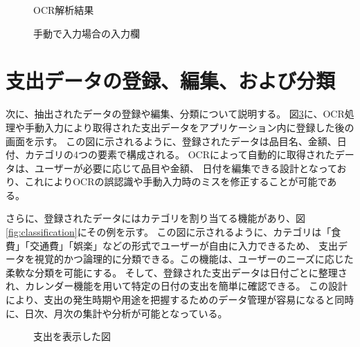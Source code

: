 \documentclass[main]{subfiles}
\begin{document}
\begin{figure}[tb]
    \begin{center}
        \caption{OCR解析結果}
        \label{fig:OCRresult}
    \end{center}
\end{figure}

\begin{figure}[tb]
    \begin{center}
        \caption{手動で入力場合の入力欄}
        \label{fig:input}
    \end{center}
\end{figure}

\section{支出データの登録、編集、および分類}

次に、抽出されたデータの登録や編集、分類について説明する。
図\ref{fig:Registration}に、OCR処理や手動入力により取得された支出データをアプリケーション内に登録した後の画面を示す。
この図に示されるように、登録されたデータは品目名、金額、日付、カテゴリの4つの要素で構成される。
OCRによって自動的に取得されたデータは、ユーザーが必要に応じて品目や金額、
日付を編集できる設計となっており、これによりOCRの誤認識や手動入力時のミスを修正することが可能である。

さらに、登録されたデータにはカテゴリを割り当てる機能があり、図\ref{fig:classification}にその例を示す。
この図に示されるように、カテゴリは「食費」「交通費」「娯楽」などの形式でユーザーが自由に入力できるため、
支出データを視覚的かつ論理的に分類できる。この機能は、ユーザーのニーズに応じた柔軟な分類を可能にする。
そして、登録された支出データは日付ごとに整理され、カレンダー機能を用いて特定の日付の支出を簡単に確認できる。
この設計により、支出の発生時期や用途を把握するためのデータ管理が容易になると同時に、日次、月次の集計や分析が可能となっている。

\begin{figure}[tb]
    \begin{center}
        \caption{支出を表示した図}
        \label{fig:Registration}
    \end{center}
\end{figure}
\end{document}
